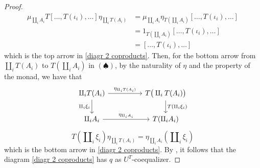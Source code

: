 \begin{subbox}{}
\begin{proof}
\begin{align*}
    \mu_{\amalg_iA_i} T[\ldots,T(\iota_i),\ldots] \eta_{\amalg_iT(A_i)} &= \mu_{\amalg_iA_i} \eta_{T(\amalg_iA_i)} [\ldots,T(\iota_i),\ldots] \\[1.5ex]
    &= 1_{T(\amalg_iA_i)} [\ldots,T(\iota_i),\ldots] \\[1.5ex]
    &= [\ldots,T(\iota_i),\ldots] 
\end{align*}
which is the top arrow in \eqref{diagr 2 coproducts}. Then, for the bottom arrow from $\amalg_iT(A_i)$ to $T(\amalg_iA_i)$ in $(\spadesuit)$, by the naturality of $\eta$ and the property of the monad, we have that
\[
\begin{tikzcd}
\amalg_iT(A_i) \arrow[rr, "\eta_{\amalg_iT(A_i)}"] \arrow[d, "\amalg_i\xi_i"'] &  & T\big(\amalg_iT(A_i)\big) \arrow[d, "T(\amalg_i\xi_i)"] \\
\amalg_iA_i \arrow[rr, "\eta_{\amalg_iA_i}"]                                 &  & T(\amalg_iA_i)                                       
\end{tikzcd}
\]
\[
T(\amalg_i\xi_i)\eta_{\amalg_iT(A_i)} = \eta_{\amalg_iA_i}(\amalg_i\xi_i)
\]
which is the bottom arrow in \eqref{diagr 2 coproducts}. By , it follows that the diagram \eqref{diagr 2 coproducts} has $q$ as $U^T$-coequalizer.


\end{proof}
\end{subbox}
